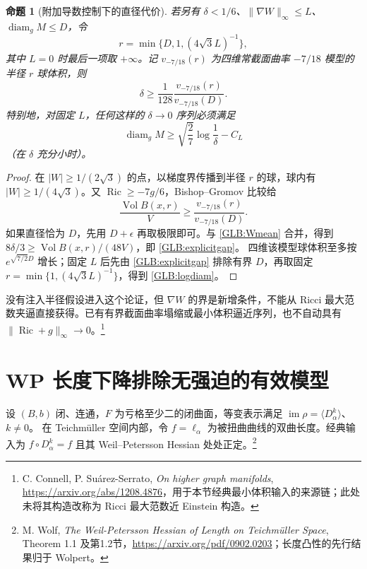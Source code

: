 \documentclass[UTF8,fontset=fandol,zihao=-4,oneside,openany]{ctexbook}
\theoremstyle{cjkplain}
\newtheorem{proposition}[theorem]{命题}
\numberwithin{equation}{chapter}
\DeclareMathOperator{\Ric}{Ric}
\DeclareMathOperator{\Vol}{Vol}
\begin{document}
\begin{proposition}[附加导数控制下的直径代价]\label{GLB:diam}
若另有 $\delta<1/6$、$\|\nabla W\|_\infty\le L$、$\operatorname{diam}_gM\le D$，令
\[
r=\min\{D,1,(4\sqrt3L)^{-1}\},
\]
其中 $L=0$ 时最后一项取 $+\infty$。记 $v_{-7/18}(r)$ 为四维常截面曲率 $-7/18$ 模型的半径 $r$ 球体积，则
\begin{equation}\label{GLB:explicitgap}
\delta\ge\frac1{128}\frac{v_{-7/18}(r)}{v_{-7/18}(D)}.
\end{equation}
特别地，对固定 $L$，任何这样的 $\delta\to0$ 序列必须满足
\begin{equation}\label{GLB:logdiam}
\operatorname{diam}_gM\ge\sqrt{\frac27}\log\frac1\delta-C_L
\end{equation}
（在 $\delta$ 充分小时）。
\end{proposition}
\begin{proof}
在 $|W|\ge1/(2\sqrt3)$ 的点，以梯度界传播到半径 $r$ 的球，球内有 $|W|\ge1/(4\sqrt3)$。又 $\Ric\ge-7g/6$，Bishop--Gromov 比较给
\[
\frac{\Vol B(x,r)}V\ge\frac{v_{-7/18}(r)}{v_{-7/18}(D)}.
\]
如果直径恰为 $D$，先用 $D+\epsilon$ 再取极限即可。与 \eqref{GLB:Wmean} 合并，得到
$8\delta/3\ge\Vol B(x,r)/(48V)$，即 \eqref{GLB:explicitgap}。
四维该模型球体积至多按 $e^{\sqrt{7/2}D}$ 增长；固定 $L$ 后先由 \eqref{GLB:explicitgap} 排除有界 $D$，再取固定 $r=\min\{1,(4\sqrt3L)^{-1}\}$，得到 \eqref{GLB:logdiam}。
\end{proof}

没有注入半径假设进入这个论证，但 $\nabla W$ 的界是新增条件，不能从 Ricci 最大范数夹逼直接获得。已有有界截面曲率塌缩或最小体积逼近序列，也不自动具有 $\|\Ric+g\|_\infty\to0$。\footnote{C. Connell, P. Suárez-Serrato, \emph{On higher graph manifolds}, \url{https://arxiv.org/abs/1208.4876}，用于本节经典最小体积输入的来源链；此处未将其构造改称为 Ricci 最大范数近 Einstein 构造。}

\section{WP 长度下降排除无强迫的有效模型}
设 $(B,b)$ 闭、连通，$F$ 为亏格至少二的闭曲面，等变表示满足
$\operatorname{im}\rho=\langle D_\alpha^k\rangle$、$k\ne0$。
在 Teichmüller 空间内部，令 $f=\ell_\alpha$ 为被扭曲曲线的双曲长度。经典输入为 $f\circ D_\alpha^k=f$ 且其 Weil--Petersson Hessian 处处正定。\footnote{M. Wolf, \emph{The Weil-Petersson Hessian of Length on Teichmüller Space}, Theorem 1.1 及第1.2节，\url{https://arxiv.org/pdf/0902.0203}；长度凸性的先行结果归于 Wolpert。}
\end{document}
